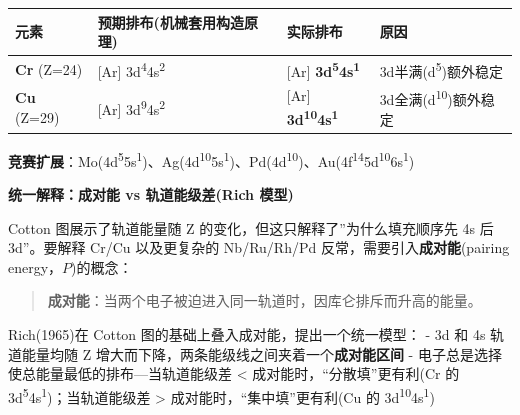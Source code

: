 {\def\LTcaptype{none} %
\begin{longtable}[]{@{}
  >{\raggedright\arraybackslash}p{}
  >{\raggedright\arraybackslash}p{}
  >{\raggedright\arraybackslash}p{}
  >{\raggedright\arraybackslash}p{}@{}}
\toprule\noalign{}
\begin{minipage}[b]{\linewidth}\raggedright
元素
\end{minipage} & \begin{minipage}[b]{\linewidth}\raggedright
预期排布(机械套用构造原理)
\end{minipage} & \begin{minipage}[b]{\linewidth}\raggedright
实际排布
\end{minipage} & \begin{minipage}[b]{\linewidth}\raggedright
原因
\end{minipage} \\
\midrule\noalign{}
\endhead
\bottomrule\noalign{}
\endlastfoot
\textbf{Cr} (Z=24) & {[}Ar{]} 3d\textsuperscript{4}4s\textsuperscript{2} & {[}Ar{]} \textbf{3d\textsuperscript{5}4s\textsuperscript{1}} & 3d半满(d\textsuperscript{5})额外稳定 \\
\textbf{Cu} (Z=29) & {[}Ar{]} 3d\textsuperscript{9}4s\textsuperscript{2} & {[}Ar{]} \textbf{3d\textsuperscript{10}4s\textsuperscript{1}} & 3d全满(d\textsuperscript{10})额外稳定 \\
\end{longtable}
}

\textbf{竞赛扩展}：Mo(4d\textsuperscript{5}5s\textsuperscript{1})、Ag(4d\textsuperscript{10}5s\textsuperscript{1})、Pd(4d\textsuperscript{10})、Au(4f\textsuperscript{14}5d\textsuperscript{10}6s\textsuperscript{1})

\textbf{统一解释：成对能 vs 轨道能级差(Rich 模型)}

Cotton 图展示了轨道能量随 Z 的变化，但这只解释了''为什么填充顺序先 4s 后 3d''。要解释 Cr/Cu 以及更复杂的 Nb/Ru/Rh/Pd 反常，需要引入\textbf{成对能}(pairing energy，\(P\))的概念：

\begin{quote}
\textbf{成对能}：当两个电子被迫进入同一轨道时，因库仑排斥而升高的能量。
\end{quote}

Rich(1965)在 Cotton 图的基础上叠入成对能，提出一个统一模型：
- 3d 和 4s 轨道能量均随 Z 增大而下降，两条能级线之间夹着一个\textbf{成对能区间}
- 电子总是选择使总能量最低的排布---当轨道能级差 \textless{} 成对能时，``分散填''更有利(Cr 的 3d\textsuperscript{5}4s\textsuperscript{1})；当轨道能级差 \textgreater{} 成对能时，``集中填''更有利(Cu 的 3d\textsuperscript{10}4s\textsuperscript{1})

